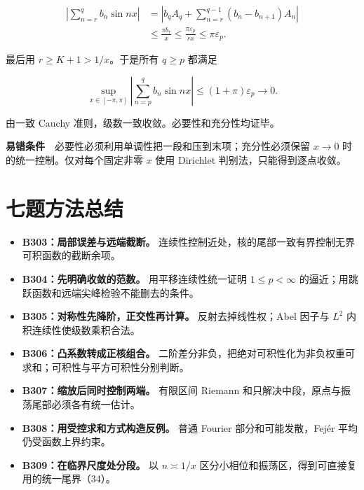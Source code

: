 \documentclass[11pt,a4paper]{article}
\providecommand{\tightlist}{\setlength{\itemsep}{3pt}\setlength{\parskip}{0pt}}
\begin{document}
\begin{equation}
\begin{aligned}
\left|\sum_{n=r}^q b_n\sin nx\right|
&=\left|b_qA_q+\sum_{n=r}^{q-1}(b_n-b_{n+1})A_n\right|\\
&\le\frac{\pi b_r}{x}
\le\frac{\pi\varepsilon_p}{rx}
\le\pi\varepsilon_p.
\end{aligned}\tag{33}
\end{equation}

最后用 \(r\ge K+1>1/x\)。于是所有 \(q\ge p\) 都满足

\begin{equation}
\sup_{x\in[-\pi,\pi]}
\left|\sum_{n=p}^q b_n\sin nx\right|
\le(1+\pi)\varepsilon_p\longrightarrow0.
\tag{34}
\end{equation}

由一致 Cauchy 准则，级数一致收敛。必要性和充分性均证毕。

\textbf{易错条件}　必要性必须利用单调性把一段和压到末项；充分性必须保留
\(x\to0\) 时的统一控制。仅对每个固定非零 \(x\) 使用 Dirichlet
判别法，只能得到逐点收敛。

\section{七题方法总结}\label{ux4e03ux9898ux65b9ux6cd5ux603bux7ed3}

\begin{itemize}
\tightlist
\item
  \textbf{B303：局部误差与远端截断。}
  连续性控制近处，核的尾部一致有界控制无界可积函数的截断余项。
\item
  \textbf{B304：先明确收敛的范数。} 用平移连续性统一证明
  \(1\le p<\infty\) 的逼近；用跳跃函数和远端尖峰检验不能删去的条件。
\item
  \textbf{B305：对称性先降阶，正交性再计算。} 反射去掉线性权；Abel
  因子与 \(L^2\) 内积连续性使级数乘积合法。
\item
  \textbf{B306：凸系数转成正核组合。}
  二阶差分非负，把绝对可积性化为非负权重可求和；可积性与平方可积性分别判断。
\item
  \textbf{B307：缩放后同时控制两端。} 有限区间 Riemann
  和只解决中段，原点与振荡尾部必须各有统一估计。
\item
  \textbf{B308：用受控求和方式构造反例。} 普通 Fourier
  部分和可能发散，Fejér 平均仍受函数上界约束。
\item
  \textbf{B309：在临界尺度处分段。} 以 \(n\asymp1/x\)
  区分小相位和振荡区，得到可直接复用的统一尾界（34）。
\end{itemize}
\end{document}
